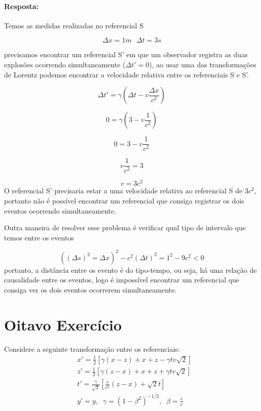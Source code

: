 \documentclass[10pt,a4paper]{article}
\begin{document}
	\paragraph{Resposta:}
	Temos as medidas realizadas no referencial S
	
	 $$\Delta x = 1 m \,\,\,\, \Delta t = 3s $$
	 
	 precisamos encontrar um referencial S' em que um observador registra as duas explosões ocorrendo simultaneamente ($ \Delta t' = 0 $), ao usar uma das transformações de Lorentz podemos encontrar a velocidade relativa entre os referenciais S e S'.
	 
	 $$ \Delta t' = \gamma \left( \Delta t - v \dfrac{\Delta x}{c^2}\right)$$

	 $$ 0 = \gamma \left( 3 - v \dfrac{1}{c^2}\right) $$
	 
	 $$ 0 =  3 - v \dfrac{1}{c^2} $$
	 
	 $$ v \dfrac{1}{c^2} = 3$$
	 
	 $$ v = 3c^2$$
	O referencial S' precisaria estar a uma velocidade relativa ao referencial S de $ 3c^2 $, portanto não é possível encontrar um referencial que consiga registrar os dois eventos ocorrendo simultaneamente.
	
	Outra maneira de resolver esse problema é verificar qual tipo de intervalo que temos entre os eventos
	
	$$( (\Delta s)^2 = \Delta x)^2 - c^2 (\Delta t)^2 = 1^2 -9c^2 < 0 $$
	portanto, a distância entre os evento é do tipo-tempo, ou seja, há uma relação de causalidade entre os eventos, logo é impossível encontrar um referencial que consiga ver os dois eventos ocorrerem simultaneamente.
	
	
	\section{Oitavo Exercício}
	Considere a seguinte transformação entre os referenciais: 
	\begin{align*}
	&x' = \frac{1}{2}\left[\gamma(x-z)+x+z-\gamma tv\sqrt{2}\right] \\
	&z'=\frac{1}{2}\left[\gamma(z-x)+x+z+\gamma tv\sqrt{2}\right]\\
	&t'=\frac{\gamma}{\sqrt{2}}\left[\frac{v}{c^2}(z-x)+\sqrt{2}t\right] \\
	&y'=y, \;\; \gamma = (1-\beta^2)^{-1/2}, \;\; \beta = \frac{v}{c}
	\end{align*}
	
\end{document}
